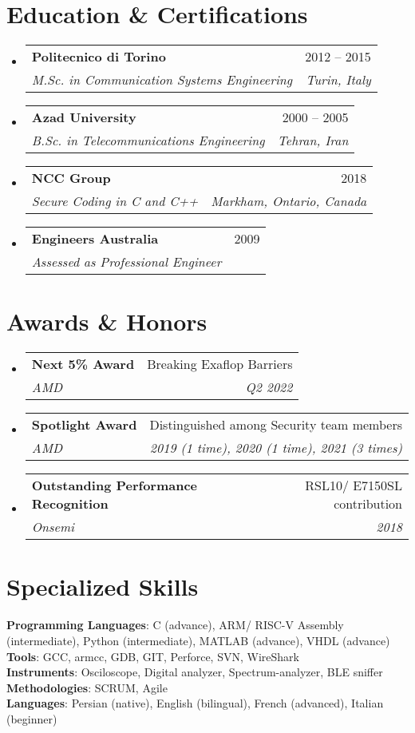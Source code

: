 \documentclass[letterpaper,11pt]{article}
\makeatletter
\newcommand{\resumeSubheading}[4]{
  \vspace{-2pt}\item
    \begin{tabular*}{0.97\textwidth}[t]{l@{\extracolsep{\fill}}r}
      \textbf{#1} & #2 \\
      \textit{\small #3} & \textit{\small #4} \\
    \end{tabular*}\vspace{-10pt}
}
\newcommand{\resumeSubHeadingListStart}{\begin{itemize}[leftmargin=0.15in, label={}]}
\newcommand{\resumeSubHeadingListEnd}{\end{itemize}}
\makeatother
\begin{document}
\section{Education \& Certifications}
\resumeSubHeadingListStart

    \resumeSubheading
        {Politecnico di Torino}{2012 -- 2015}
        {M.Sc. in Communication Systems Engineering}{Turin, Italy}
      \resumeSubheading
        {Azad University}{2000 -- 2005}
        {B.Sc. in Telecommunications Engineering}{Tehran, Iran}
       \resumeSubheading
        {NCC Group}{2018}
        {Secure Coding in C and C++}{Markham, Ontario, Canada}
       \resumeSubheading
        {Engineers Australia}{2009}
        {Assessed as Professional Engineer}{}


\resumeSubHeadingListEnd

\section{Awards \& Honors} 
\resumeSubHeadingListStart
    \resumeSubheading
    {Next 5\% Award}{Breaking Exaflop Barriers}
    {AMD}{Q2 2022}
    \resumeSubheading
    {Spotlight Award}{Distinguished among Security team members}
    {AMD}{2019 (1 time), 2020 (1 time), 2021 (3 times)}
    \resumeSubheading
    {Outstanding Performance Recognition}{RSL10/ E7150SL contribution}
    {Onsemi}{2018}
\resumeSubHeadingListEnd

\section{Specialized Skills}
\begin{itemize}[leftmargin=0.15in, label={}]
    \normalsize{\item{
     \textbf{Programming Languages}{: C (advance), ARM/ RISC-V Assembly (intermediate), Python (intermediate), MATLAB (advance), VHDL (advance)} \\
     \textbf{Tools}{: GCC, armcc, GDB, GIT, Perforce, SVN, WireShark} \\
     \textbf{Instruments}{: Osciloscope, Digital analyzer, Spectrum-analyzer, BLE sniffer} \\
     \textbf{Methodologies}{: SCRUM, Agile} \\
     \textbf{Languages}{: Persian (native), English (bilingual), French (advanced), Italian (beginner)}\\
    }}
 \end{itemize}
\end{document}
